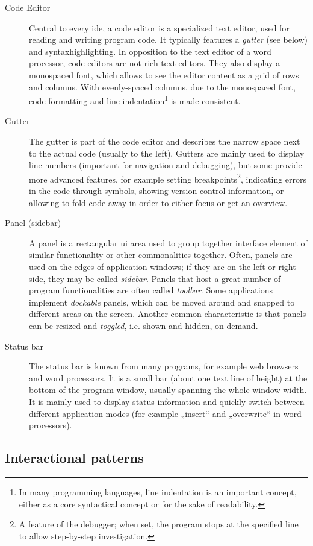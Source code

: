 \begin{description}
\item[Code Editor]
Central to every \gls{ide}, a code editor is a specialized text editor,
used for reading and writing program code. It typically features a
\emph{gutter} (see below) and \gls{syntaxhighlighting}. In opposition to
the text editor of a word processor, code editors are not rich text
editors. They also display a monospaced font, which allows to see the
editor content as a grid of rows and columns. With evenly-spaced
columns, due to the monospaced font, code formatting and line
indentation\footnote{In many programming languages, line indentation is an important concept, either as a core syntactical concept or for the sake of readability.}
is made consistent.
\item[Gutter]
The gutter is part of the code editor and describes the narrow space
next to the actual code (usually to the left). Gutters are mainly used
to display line numbers (important for navigation and debugging), but
some provide more advanced features, for example setting
breakpoints\footnote{A feature of the debugger; when set, the program stops at the specified line to allow step-by-step investigation.},
indicating errors in the code through symbols, showing version control
information, or allowing to fold code away in order to either focus or
get an overview.
\item[Panel (sidebar)]
A panel is a rectangular \ac{ui} area used to group together interface
element of similar functionality or other commonalities together. Often,
panels are used on the edges of application windows; if they are on the
left or right side, they may be called \emph{sidebar}. Panels that host
a great number of program functionalities are often called
\emph{toolbar}. Some applications implement \emph{dockable} panels,
which can be moved around and snapped to different areas on the screen.
Another common characteristic is that panels can be resized and
\emph{toggled}, i.e. shown and hidden, on demand.
\item[Status bar]
The status bar is known from many programs, for example web browsers and
word processors. It is a small bar (about one text line of height) at
the bottom of the program window, usually spanning the whole window
width. It is mainly used to display status information and quickly
switch between different application modes (for example „insert“ and
„overwrite“ in word processors).
\end{description}

\subsection{Interactional patterns}\label{interactional-patterns}

